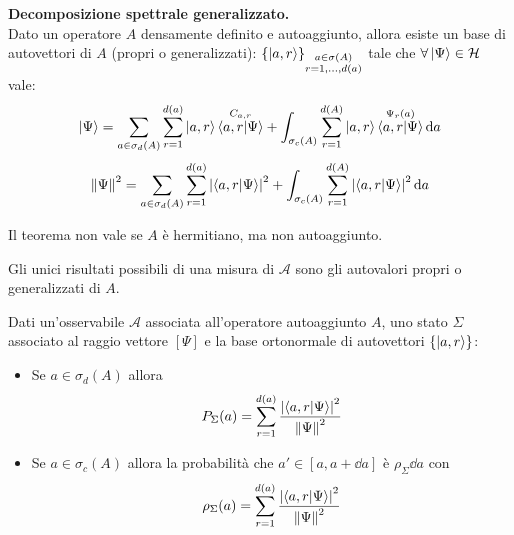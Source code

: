 \begin{theorem}
    {\normalfont \textbf{Decomposizione spettrale generalizzato.}}\\
    Dato un operatore \(A\) densamente definito e autoaggiunto, allora esiste un base di autovettori di \(A\) (propri o generalizzati):
    \(
        \left\{ \ket{a, r} \right\}_{\substack{a \in \sigma(A)\\ r = 1,\dots,d(a)}}
    \) tale che \(\forall \ket{\Psi} \in \mathcal{H}\) vale:
    \begin{equation}
        \ket{\Psi}= \sum_{a \in \sigma_d(A)} \sum_{r=1}^{d(a)} \ket{a,r}\overset{C_{a,r}}{\braket{a,r}{\Psi}} +
        \int_{\sigma_c(A)}\sum_{r=1}^{d(A)}\ket{a,r}\overset{\Psi_r(a)}{\braket{a,r}{\Psi}}\dd{a}
    \end{equation}
    \begin{equation}
        \norm{\Psi}^2=\sum_{a \in \sigma_d(A)} \sum_{r=1}^{d(a)} \abs{\braket{a,r}{\Psi}}^2 +
        \int_{\sigma_c(A)}\sum_{r=1}^{d(A)}\abs{\braket{a,r}{\Psi}}^2\dd{a}
    \end{equation}

\end{theorem}

\begin{attention}
    Il teorema non vale se \(A\) è hermitiano, ma non autoaggiunto.
\end{attention}


\begin{postulato3}
    Gli unici risultati possibili di una misura di \(\mathcal{A}\) sono gli autovalori propri o generalizzati di \(A\).
\end{postulato3}

\begin{postulato4}
    Dati un'osservabile \(\mathcal{A}\) associata all'operatore autoaggiunto \(A\),
    uno stato \(\Sigma\) associato al raggio vettore \([\Psi]\) e la base ortonormale di autovettori \(\left\{ \ket{a,r} \right\}\):
    \begin{itemize}
        \item Se \(a \in \sigma_d(A)\) allora \[
            P_\Sigma(a)= \sum_{r=1}^{d(a)}\frac{\abs{\braket{a,r}{\Psi}}^2}{\norm{\Psi}^2}
        \]
        \item Se \(a \in \sigma_c(A)\) allora la probabilità che \(a' \in [a,a + \dd{a}]\) è \(\rho_\Sigma \dd{a}\) con \[
            \rho_\Sigma (a) = \sum_{r=1}^{d(a)}\frac{\abs{\braket{a,r}{\Psi}}^2}{\norm{\Psi}^2}
        \]
    \end{itemize}
\end{postulato4}


